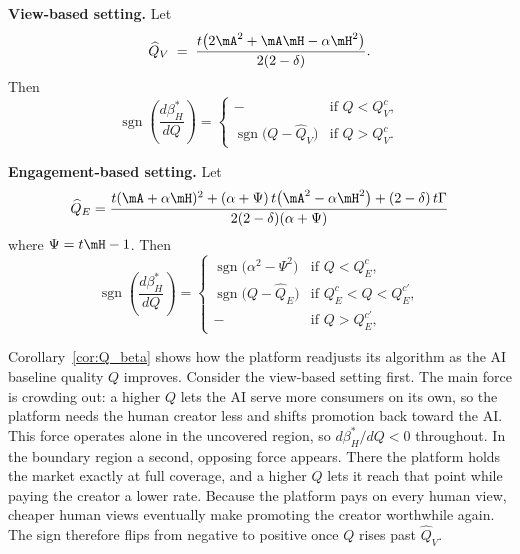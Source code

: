 \begin{corollary}\label{cor:Q_beta}
\textbf{View-based setting.} Let
\[
\widehat Q_{V}\;=\;\frac{t\bigl(2\mA^{2}+\mA\mH-\alpha\mH^{2}\bigr)}{2(2-\delta)} .
\]
Then
\[
\operatorname{sgn}\left(\frac{d\beta_H^*}{dQ}\right)=
\begin{cases}
- & \text{if } Q<Q^{c}_{V},\\[4pt]
\operatorname{sgn}\!\bigl(Q-\widehat Q_{V}\bigr) & \text{if } Q>Q^{c}_{V}.
\end{cases}
\]

\smallskip
\textbf{Engagement-based setting.} Let
\[
    \widehat Q_{E}=\frac{t(\mA+\alpha\mH)^{2}+(\alpha+\Psi)\,t\bigl(\mA^{2}-\alpha\mH^{2}\bigr)+(2-\delta)\,t\Gamma}
{2(2-\delta)(\alpha+\Psi)}
\]
where $\Psi=t\mH-1$. Then
\[
\operatorname{sgn}\left(\frac{d\beta_H^*}{dQ}\right)=
\begin{cases}
\operatorname{sgn}\!\bigl(\alpha^{2}-\Psi^{2}\bigr)
 & \text{if } Q<Q^{c}_{E} ,\\[6pt]
\operatorname{sgn}\!\bigl(Q-\widehat Q_{E}\bigr)
 & \text{if } Q^{c}_{E}< Q<Q^{c'}_{E} ,\\[6pt]
-
 & \text{if } Q> Q^{c'}_{E},
\end{cases}
\]
\end{corollary}

Corollary~\ref{cor:Q_beta} shows how the platform readjusts its algorithm as the
AI baseline quality $Q$ improves. Consider the view-based setting first. The
main force is crowding out: a higher $Q$ lets the AI serve more consumers on its
own, so the platform needs the human creator less and shifts promotion back
toward the AI. This force operates alone in the uncovered region, so $d\beta_H^*/dQ < 0$ throughout. In
the boundary region a second, opposing force appears. There the platform holds
the market exactly at full coverage, and a higher $Q$ lets it reach that point
while paying the creator a lower rate. Because the platform pays on every human
view, cheaper human views eventually make promoting the creator worthwhile
again. The sign therefore flips from negative to positive once $Q$ rises past
$\widehat Q_V$.

